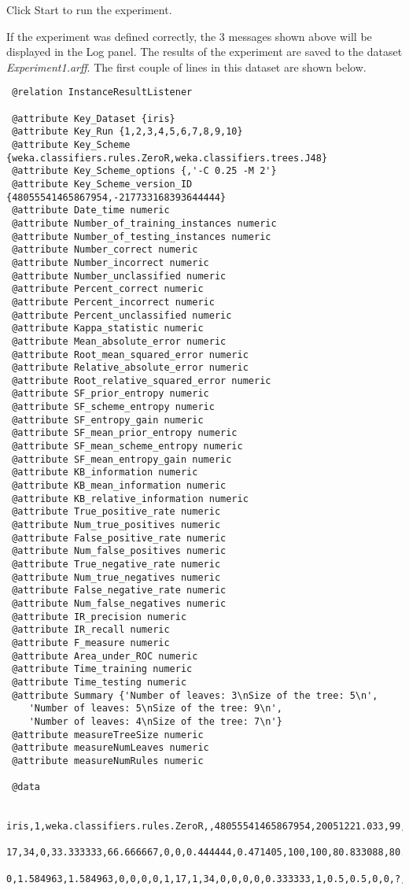 \documentclass[a4paper]{article}
\begin{document}
Click Start to run the experiment.
\begin{center}
\end{center}

If the experiment was defined correctly, the 3 messages shown above will be displayed in the Log panel. The results of the experiment are saved to the dataset \textit{Experiment1.arff}. The first couple of lines in this dataset are shown below.

\begin{verbatim}
 @relation InstanceResultListener
 
 @attribute Key_Dataset {iris}
 @attribute Key_Run {1,2,3,4,5,6,7,8,9,10}
 @attribute Key_Scheme {weka.classifiers.rules.ZeroR,weka.classifiers.trees.J48}
 @attribute Key_Scheme_options {,'-C 0.25 -M 2'}
 @attribute Key_Scheme_version_ID {48055541465867954,-217733168393644444}
 @attribute Date_time numeric
 @attribute Number_of_training_instances numeric
 @attribute Number_of_testing_instances numeric
 @attribute Number_correct numeric
 @attribute Number_incorrect numeric
 @attribute Number_unclassified numeric
 @attribute Percent_correct numeric
 @attribute Percent_incorrect numeric
 @attribute Percent_unclassified numeric
 @attribute Kappa_statistic numeric
 @attribute Mean_absolute_error numeric
 @attribute Root_mean_squared_error numeric
 @attribute Relative_absolute_error numeric
 @attribute Root_relative_squared_error numeric
 @attribute SF_prior_entropy numeric
 @attribute SF_scheme_entropy numeric
 @attribute SF_entropy_gain numeric
 @attribute SF_mean_prior_entropy numeric
 @attribute SF_mean_scheme_entropy numeric
 @attribute SF_mean_entropy_gain numeric
 @attribute KB_information numeric
 @attribute KB_mean_information numeric
 @attribute KB_relative_information numeric
 @attribute True_positive_rate numeric
 @attribute Num_true_positives numeric
 @attribute False_positive_rate numeric
 @attribute Num_false_positives numeric
 @attribute True_negative_rate numeric
 @attribute Num_true_negatives numeric
 @attribute False_negative_rate numeric
 @attribute Num_false_negatives numeric
 @attribute IR_precision numeric
 @attribute IR_recall numeric
 @attribute F_measure numeric
 @attribute Area_under_ROC numeric
 @attribute Time_training numeric
 @attribute Time_testing numeric
 @attribute Summary {'Number of leaves: 3\nSize of the tree: 5\n',
    'Number of leaves: 5\nSize of the tree: 9\n',
    'Number of leaves: 4\nSize of the tree: 7\n'}
 @attribute measureTreeSize numeric
 @attribute measureNumLeaves numeric
 @attribute measureNumRules numeric

 @data
 
 iris,1,weka.classifiers.rules.ZeroR,,48055541465867954,20051221.033,99,51,
 17,34,0,33.333333,66.666667,0,0,0.444444,0.471405,100,100,80.833088,80.833088,
 0,1.584963,1.584963,0,0,0,0,1,17,1,34,0,0,0,0,0.333333,1,0.5,0.5,0,0,?,?,?,?
\end{verbatim}
\end{document}
